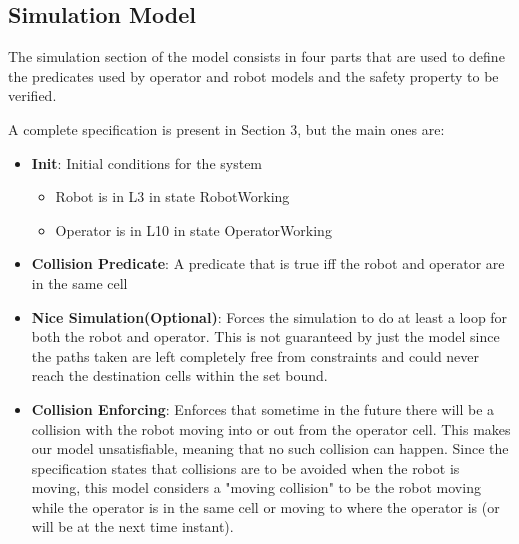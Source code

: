 
\subsection{Simulation Model}
The simulation section of the model consists in four parts that are used to define the predicates used by operator and robot models and the safety property to be verified.

A complete specification is present in Section 3, but the main ones are:
\begin{itemize}
	\item \textbf{Init}: Initial conditions for the system
	\begin{itemize}
		\item Robot is in L3 in state RobotWorking
		\item Operator is in L10 in state OperatorWorking
	\end{itemize}
	
	\item \textbf{Collision Predicate}: A predicate that is true iff the robot and operator are in the same cell
	
	\item \textbf{Nice Simulation(Optional)}: Forces the simulation to do at least a loop for both the robot and operator. This is not guaranteed by just the model since the paths taken are left completely free from constraints and could never reach the destination cells within the set bound.
	
	
	\item \textbf{Collision Enforcing}: Enforces that sometime in the future there will be a collision with the robot moving into or out from the operator cell. This makes our model unsatisfiable, meaning that no such collision can happen.
	Since the specification states that collisions are to be avoided when the robot is moving, this model considers a "moving collision" to be the robot moving while the operator is in the same cell or moving to where the operator is (or will be at the next time instant).
\end{itemize}

